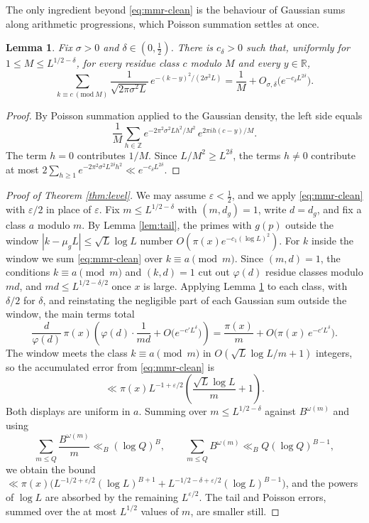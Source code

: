 \documentclass[11pt,reqno]{amsart}
\theoremstyle{plain}
\newtheorem{lemma}[theorem]{Lemma}
\theoremstyle{definition}
\newcommand{\Z}{\mathbb{Z}}
\newcommand{\R}{\mathbb{R}}
\begin{document}
The only ingredient beyond \eqref{eq:mmr-clean} is the behaviour of Gaussian sums along arithmetic progressions, which Poisson summation settles at once.

\begin{lemma}\label{lem:poisson}
Fix $\sigma>0$ and $\delta\in(0,\tfrac12)$. There is $c_\delta>0$ such that, uniformly for $1\le M\le L^{1/2-\delta}$, for every residue class $c$ modulo $M$ and every $y\in\R$,
\[
\sum_{k\equiv c\ (\mathrm{mod}\ M)}\frac{1}{\sqrt{2\pi\sigma^2L}}\,
e^{-(k-y)^{2}/(2\sigma^{2}L)}
=\frac1M+O_{\sigma,\delta}\big(e^{-c_\delta L^{2\delta}}\big).
\]
\end{lemma}

\begin{proof}
By Poisson summation applied to the Gaussian density, the left side equals
\[
\frac1M\sum_{h\in\Z}e^{-2\pi^{2}\sigma^{2}Lh^{2}/M^{2}}\,e^{2\pi ih(c-y)/M}.
\]
The term $h=0$ contributes $1/M$. Since $L/M^{2}\ge L^{2\delta}$, the terms $h\ne0$ contribute at most $2\sum_{h\ge1}e^{-2\pi^{2}\sigma^{2}L^{2\delta}h^{2}}\ll e^{-c_\delta L^{2\delta}}$.
\end{proof}

\begin{proof}[Proof of Theorem \ref{thm:level}]
We may assume $\varepsilon<\tfrac12$, and we apply \eqref{eq:mmr-clean} with $\varepsilon/2$ in place of $\varepsilon$. Fix $m\le L^{1/2-\delta}$ with $(m,d_g)=1$, write $d=d_g$, and fix a class $a$ modulo $m$. By Lemma \ref{lem:tail}, the primes with $g(p)$ outside the window $|k-\mu_gL|\le\sqrt L\log L$ number $O(\pi(x)e^{-c_1(\log L)^{2}})$. For $k$ inside the window we sum \eqref{eq:mmr-clean} over $k\equiv a\pmod m$. Since $(m,d)=1$, the conditions $k\equiv a\pmod m$ and $(k,d)=1$ cut out $\varphi(d)$ residue classes modulo $md$, and $md\le L^{1/2-\delta/2}$ once $x$ is large. Applying Lemma \ref{lem:poisson} to each class, with $\delta/2$ for $\delta$, and reinstating the negligible part of each Gaussian sum outside the window, the main terms total
\[
\frac d{\varphi(d)}\,\pi(x)\left(\varphi(d)\cdot\frac1{md}+O\big(e^{-c'L^{\delta}}\big)\right)
=\frac{\pi(x)}m+O\big(\pi(x)\,e^{-c'L^{\delta}}\big).
\]
The window meets the class $k\equiv a\pmod m$ in $O(\sqrt L\log L/m+1)$ integers, so the accumulated error from \eqref{eq:mmr-clean} is
\[
\ll \pi(x)L^{-1+\varepsilon/2}\left(\frac{\sqrt L\log L}{m}+1\right).
\]
Both displays are uniform in $a$. Summing over $m\le L^{1/2-\delta}$ against $B^{\omega(m)}$ and using
\[
\sum_{m\le Q}\frac{B^{\omega(m)}}m\ll_B(\log Q)^{B},
\qquad
\sum_{m\le Q}B^{\omega(m)}\ll_B Q(\log Q)^{B-1},
\]
we obtain the bound $\ll\pi(x)\big(L^{-1/2+\varepsilon/2}(\log L)^{B+1}+L^{-1/2-\delta+\varepsilon/2}(\log L)^{B-1}\big)$, and the powers of $\log L$ are absorbed by the remaining $L^{\varepsilon/2}$. The tail and Poisson errors, summed over the at most $L^{1/2}$ values of $m$, are smaller still.
\end{proof}
\end{document}
